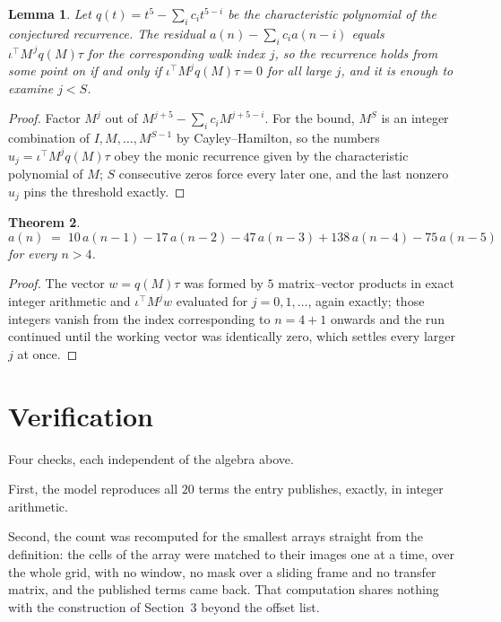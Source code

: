 \documentclass[11pt,a4paper]{article}
\theoremstyle{plain}
\newtheorem{theorem}{Theorem}
\newtheorem{lemma}[theorem]{Lemma}
\theoremstyle{definition}
\begin{document}
\begin{lemma}\label{lem:crit}
Let $q(t)=t^{5}-\sum_i c_it^{5-i}$ be the characteristic polynomial of the
conjectured recurrence. The residual $a(n)-\sum_ic_ia(n-i)$ equals
$\iota^{\!\top}M^{\,j}q(M)\tau$ for the corresponding walk index $j$, so the recurrence
holds from some point on if and only if $\iota^{\!\top}M^{j}q(M)\tau=0$ for all large $j$,
and it is enough to examine $j<S$.
\end{lemma}

\begin{proof}
Factor $M^{j}$ out of $M^{j+5}-\sum_ic_iM^{j+5-i}$. For the bound, $M^{S}$
is an integer combination of $I,M,\dots,M^{S-1}$ by Cayley--Hamilton, so the numbers
$u_j=\iota^{\!\top}M^{j}q(M)\tau$ obey the monic recurrence given by the characteristic
polynomial of $M$; $S$ consecutive zeros force every later one, and the last nonzero $u_j$
pins the threshold exactly.
\end{proof}

\begin{theorem}
\[
a(n)\;=\;10\,a(n-1) - 17\,a(n-2) - 47\,a(n-3) + 138\,a(n-4) - 75\,a(n-5)
\]
for every $n>4$.
\end{theorem}

\begin{proof}
The vector $w=q(M)\tau$ was formed by $5$ matrix--vector products in exact integer
arithmetic and $\iota^{\!\top}M^{j}w$ evaluated for $j=0,1,\dots$, again exactly; those
integers vanish from the index corresponding to $n=4+1$ onwards and the run continued
until the working vector was identically zero, which settles every larger $j$ at once.
\end{proof}

\section{Verification}

Four checks, each independent of the algebra above.

First, the model reproduces all $20$ terms the entry publishes, exactly, in integer
arithmetic.

Second, the count was recomputed for the smallest arrays straight from the definition: the
cells of the array were matched to their images one at a time, over the whole grid, with no
window, no mask over a sliding frame and no transfer matrix, and the published terms came back.
That computation shares nothing with the construction of Section~3 beyond the offset list.
\end{document}
